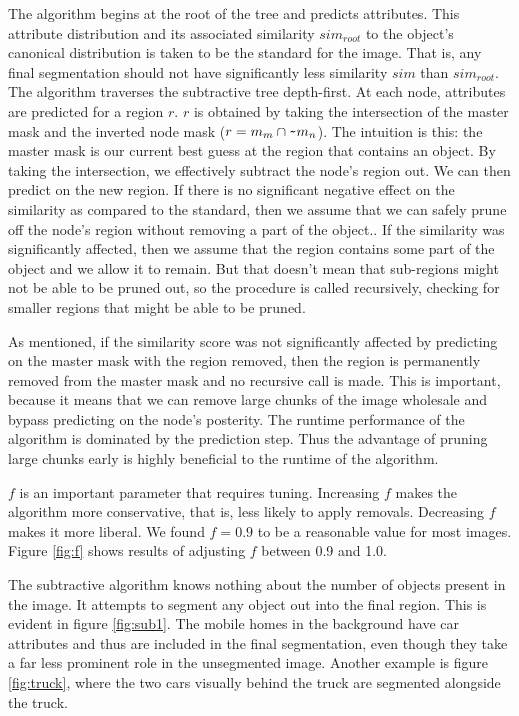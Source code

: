 \documentclass[10pt,twocolumn,letterpaper]{article}
\begin{document}
The algorithm begins at the root of the tree and predicts attributes.
This attribute distribution and its associated similarity $sim_{root}$
to the object's canonical distribution is taken to be
the standard for the image.  That is, any final segmentation should not have
significantly less similarity $sim$ than $sim_{root}$.  The algorithm traverses
the subtractive tree depth-first.  At each node, attributes are predicted for 
a region $r$.  
$r$ is obtained by taking the intersection of the master mask and the inverted
node mask ($r = m_{m} \cap \verb+~+ m_{n}$).  The intuition is this: the master mask is our current best guess at
the region that contains an object.  By taking the intersection, we effectively
subtract the node's region out.
We can then predict on the new region.  If 
there is no significant negative effect on the similarity as
compared to the standard, then we assume that we can safely prune off the node's
region without removing a part of the object..  If the
similarity was significantly affected, then we assume that the region
contains some part of the object and we allow it to remain.  But that 
doesn't mean that sub-regions might not be able to be pruned
out, so the procedure is called recursively, checking for smaller regions
that might be able to be pruned.

As mentioned, if the similarity score was not significantly affected by
predicting on the master mask with the region removed, then the region is
permanently removed from the master mask
and no recursive call is made.  This is important, because it means
that we can remove large chunks of the image wholesale and bypass predicting
on the node's posterity.
The runtime performance of the algorithm is dominated by the prediction step.
Thus the advantage of pruning large chunks early is highly beneficial to
the runtime of the algorithm.

$f$ is an important parameter that requires tuning.  Increasing $f$ makes the
algorithm more conservative, that is, less likely to apply removals.  Decreasing
$f$ makes it more liberal.  We found $f=0.9$ to be a reasonable value for most images.
Figure \ref{fig:f} shows results of adjusting $f$ between 0.9 and 1.0.

The subtractive algorithm knows nothing about the number of objects present
in the image.  It attempts to segment any object out into the final region.
This is evident in figure \ref{fig:sub1}.  The mobile homes in the background
have car attributes and thus are included in the final segmentation, even
though they take a far less prominent role in the unsegmented image.  Another
example is figure \ref{fig:truck}, where the two cars visually behind the truck
are segmented alongside the truck.
\end{document}

